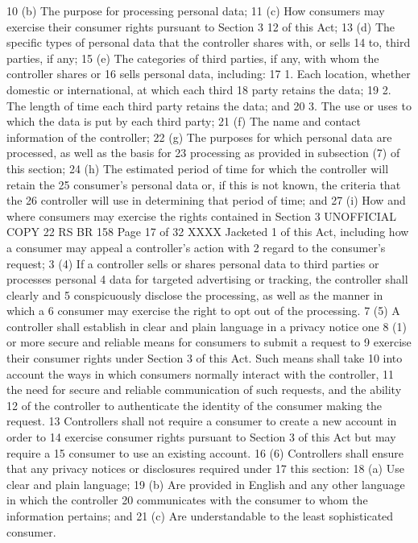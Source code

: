 10 (b) The purpose for processing personal data;
11 (c) How consumers may exercise their consumer rights pursuant to Section 3
12 of this Act;
13 (d) The specific types of personal data that the controller shares with, or sells
14 to, third parties, if any;
15 (e) The categories of third parties, if any, with whom the controller shares or
16 sells personal data, including:
17 1. Each location, whether domestic or international, at which each third
18 party retains the data;
19 2. The length of time each third party retains the data; and
20 3. The use or uses to which the data is put by each third party;
21 (f) The name and contact information of the controller;
22 (g) The purposes for which personal data are processed, as well as the basis for
23 processing as provided in subsection (7) of this section;
24 (h) The estimated period of time for which the controller will retain the
25 consumer's personal data or, if this is not known, the criteria that the
26 controller will use in determining that period of time; and
27 (i) How and where consumers may exercise the rights contained in Section 3 
UNOFFICIAL COPY 22 RS BR 158
Page 17 of 32
XXXX Jacketed
1 of this Act, including how a consumer may appeal a controller's action with
2 regard to the consumer's request;
3 (4) If a controller sells or shares personal data to third parties or processes personal
4 data for targeted advertising or tracking, the controller shall clearly and
5 conspicuously disclose the processing, as well as the manner in which a
6 consumer may exercise the right to opt out of the processing.
7 (5) A controller shall establish in clear and plain language in a privacy notice one
8 (1) or more secure and reliable means for consumers to submit a request to
9 exercise their consumer rights under Section 3 of this Act. Such means shall take
10 into account the ways in which consumers normally interact with the controller,
11 the need for secure and reliable communication of such requests, and the ability
12 of the controller to authenticate the identity of the consumer making the request.
13 Controllers shall not require a consumer to create a new account in order to
14 exercise consumer rights pursuant to Section 3 of this Act but may require a
15 consumer to use an existing account.
16 (6) Controllers shall ensure that any privacy notices or disclosures required under
17 this section:
18 (a) Use clear and plain language;
19 (b) Are provided in English and any other language in which the controller
20 communicates with the consumer to whom the information pertains; and
21 (c) Are understandable to the least sophisticated consumer.
